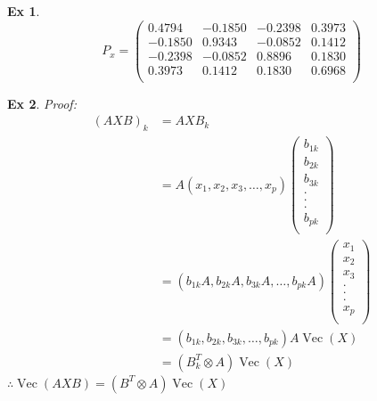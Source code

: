 \documentclass[12pt, oneside]{article}
\newtheorem{exercise}{Ex}
\begin{document}
  \begin{exercise}
	\begin{equation*}
	  P_x = \left(
	  \begin{array}{cccc}
		0.4794 & -0.1850 & -0.2398 & 0.3973 \\
		-0.1850 & 0.9343 & -0.0852 & 0.1412 \\
		-0.2398 & -0.0852 & 0.8896 & 0.1830 \\
		0.3973 & 0.1412 & 0.1830 & 0.6968 \\
	  \end{array}
	  \right)
	\end{equation*}
  \end{exercise}

  \begin{exercise}
	Proof:\\
	\begin{equation*}
	  \begin{aligned}
		\left( AXB \right)_k &= AXB_k \\
		&= A \left( x_1, x_2, x_3, \dots , x_p \right)
		\left(
		\begin{array}{c}
		  b_{1k} \\
		  b_{2k} \\
		  b_{3k} \\
		  . \\
		  . \\
		  . \\
		  b_{pk} \\
		\end{array}
		\right) \\
		&= \left( b_{1k}A, b_{2k}A, b_{3k}A, \dots , b_{pk}A\right) \left( 
		\begin{array}{c}
		  x_1 \\
		  x_2 \\
		  x_3 \\
		  . \\
		  . \\
		  . \\
		  x_p \\
		\end{array}
		\right) \\
		&= \left( b_{1k}, b_{2k}, b_{3k}, \dots , b_{pk}\right)A\operatorname{Vec}\left( X \right) \\
		&= \left( B_k^T \otimes A \right) \operatorname{Vec} \left( X \right) 
	  \end{aligned} 
	\end{equation*}
	$\therefore \operatorname{Vec}\left( AXB \right)	= \left( B^T \otimes A \right) \operatorname{Vec} \left( X \right)$
  \end{exercise}
\end{document}
